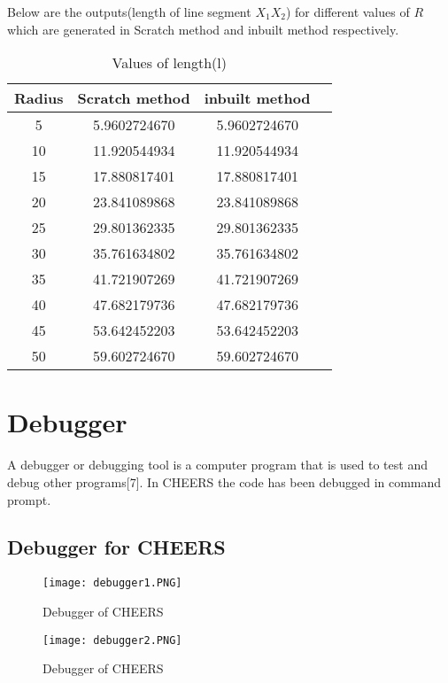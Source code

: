 \documentclass[11pt]{article}
\begin{document}
		Below are the outputs(length of line segment $X_1X_2$) for different values of $R$ which are generated in Scratch method and inbuilt method respectively.\\
		
		\begin{table}[ht] 
			\caption{Values of length(l)}
			\centering 
			\begin{tabular}{c c c c}
				\hline
				
				Radius  & Scratch method & inbuilt method \\ [0.5ex] 	
				
				\hline
				5  & 5.9602724670 & 5.9602724670 \\
				10 & 11.920544934 & 11.920544934 \\
				15 & 17.880817401 & 17.880817401 \\
				20 & 23.841089868 &	23.841089868 \\
				25 & 29.801362335 &	29.801362335 \\
				30 & 35.761634802 & 35.761634802 \\
				35 & 41.721907269 &	41.721907269 \\
				40 & 47.682179736 &	47.682179736 \\
				45 & 53.642452203 &	53.642452203 \\
				50 & 59.602724670 & 59.602724670 \\
				\hline 
			\end{tabular}
			\label{table:nonlin} 
		\end{table}

\section{Debugger}
	
		A debugger or debugging tool is a computer program that is used to test and debug other programs[7]. In CHEERS the code has been debugged in command prompt.

	\newpage
	\subsection{Debugger for CHEERS}		
		\begin{figure}[h!]
			\texttt{[image: debugger1.PNG]} %
			\caption{Debugger of CHEERS }
		\end{figure}	
		\begin{figure}[h!]
			\texttt{[image: debugger2.PNG]} %
			\caption{Debugger of CHEERS }
		\end{figure}
	
\end{document}
